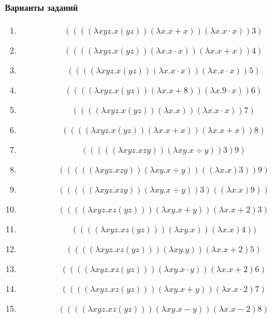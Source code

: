 \documentclass[a4paper,12pt]{article}
\begin{document}
\paragraph{Варианты заданий}
\begin{enumerate}
	\item \[ ((((\lambda xyz.x(yz))(\lambda x.x+x))(\lambda x.x\cdot x))3) \]
	\item \[ ((((\lambda xyz.x(yz))(\lambda x.x\cdot x))(\lambda x.x+x))4) \]
  \item \[ ((((\lambda xyz.x(yz))(\lambda x.x\cdot x))(\lambda x.x\cdot x))5) \]
	\item \[ ((((\lambda xyz.x(yz))(\lambda x.x+8))(\lambda x.9\cdot x))6) \]
	\item \[ ((((\lambda xyz.x(yz))(\lambda x.x))(\lambda x.x\cdot x))7)\]
	\item \[ ((((\lambda xyz.x(yz))(\lambda x.x+x))(\lambda x.x+x))8)\]
	\item \[ (((((\lambda xyz.xzy))(\lambda xy.x\div y))3)9)\]
	\item \[ (((((\lambda xyz.xzy))(\lambda xy.x\div y))((\lambda x.x)3))9)\]
	\item \[ (((((\lambda xyz.xzy))(\lambda xy.x\div y))3)((\lambda x.x)9))\]
	\item \[ ((((\lambda xyz.xz(yz)))(\lambda xy.x+y))(\lambda x.x+2)3)\]
	\item \[ ((((\lambda xyz.xz(yz)))(\lambda xy.x))(\lambda x.x)4))\]
	\item \[ ((((\lambda xyz.xz(yz)))(\lambda xy.y))(\lambda x.x+2)5)\]
	\item \[ ((((\lambda xyz.xz(yz)))(\lambda xy.x\cdot y))(\lambda x.x+2)6)\]
	\item \[ ((((\lambda xyz.xz(yz)))(\lambda xy.x+y))(\lambda x.x\cdot 2)7)\]
	\item \[ ((((\lambda xyz.xz(yz)))(\lambda xy.x-y))(\lambda x.x-2)8)\]
\end{enumerate}
\end{document}
